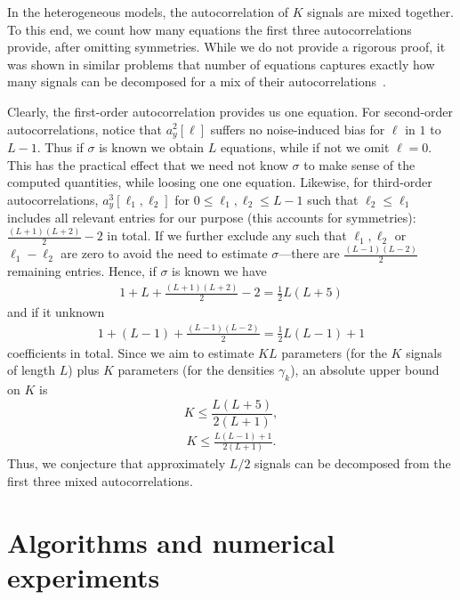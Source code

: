 \documentclass[12pt]{article}
\newcommand{\1}{\mathbf{1}}
\newcommand{\TODO}[1]{{\color{red}{[#1]}}}
\theoremstyle{plain}
\theoremstyle{definition}
\theoremstyle{remark}
\theoremstyle{plain}
\theoremstyle{remark}
\theoremstyle{plain}
\theoremstyle{plain}
\theoremstyle{plain}
\numberwithin{equation}{section}
\begin{document}
In the heterogeneous models, the autocorrelation of $K$ signals are mixed together. To this end, we count how many equations the first three autocorrelations provide, after omitting symmetries. While we do not provide a rigorous proof, it was shown in similar problems that number of equations captures exactly how many signals can be decomposed for a mix of their autocorrelations~\cite{bandeira2017estimation}.

\TODO{Probably should be re-written}
Clearly, the first-order autocorrelation provides us one equation. For second-order autocorrelations, notice  that $a_y^2[\ell]$ suffers no noise-induced bias for $\ell$ in $1$ to $L-1$. Thus if $\sigma$ is known we obtain $L$ equations, while if not we omit $\ell = 0$. This has the practical effect that we need not know $\sigma$ to make sense of the computed quantities, while loosing one one equation. 
Likewise, for third-order autocorrelations, $a_y^3[\ell_1, \ell_2]$ for $0 \leq \ell_1, \ell_2 \leq L-1$ such that $\ell_2 \leq \ell_1$ includes all relevant entries for our purpose (this accounts for symmetries): $\frac{(L+1)(L+2)}{2}-2$ in total. 
If we further exclude any such that $\ell_1, \ell_2$ or $\ell_1 - \ell_2$ are zero to avoid the need to estimate $\sigma$---there are $\frac{(L-1)(L-2)}{2}$ remaining entries. 
Hence, if $\sigma$ is known we have 
\begin{align*}
1 + L + \frac{(L+1)(L+2)}{2}-2 = \frac{1}{2} L (L+5)
\end{align*}
and if it unknown
\begin{align*}
1 + (L-1) + \frac{(L-1)(L-2)}{2} = \frac{1}{2} L (L-1) + 1
\end{align*}
coefficients in total. Since we aim to estimate $KL$ parameters (for the $K$ signals of length $L$) plus $K$ parameters (for the densities $\gamma_k$), an absolute upper bound on $K$  is
\begin{equation}
K\leq \frac{L(L+5)}{2(L+1)},
\end{equation}
\begin{align*}
K \leq \frac{ L (L-1) + 1}{2(L+1)}.
\end{align*}
Thus, we conjecture that approximately $L/2$ signals can be decomposed from  the first three mixed autocorrelations.


\section{Algorithms and numerical experiments} \label{sec:numerics}
\end{document}

